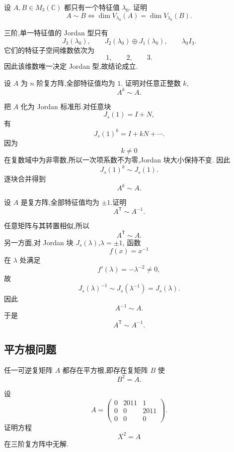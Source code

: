 \begin{example}
设 $A,B\in M_3(\mathbb{C})$ 都只有一个特征值 $\lambda_0$.
证明
\[
A\sim B
\iff
\dim V_{\lambda_0}(A)=\dim V_{\lambda_0}(B).
\]
\end{example}
\exampleblank

\begin{solution}
三阶,单一特征值的 Jordan 型只有
\[
J_3(\lambda_0),\qquad
J_2(\lambda_0)\oplus J_1(\lambda_0),\qquad
\lambda_0I_3.
\]
它们的特征子空间维数依次为
\[
1,\qquad2,\qquad3.
\]
因此该维数唯一决定 Jordan 型,故结论成立.
\end{solution}


\begin{example}[\markstar]
设 $A$ 为 $n$ 阶复方阵,全部特征值均为 $1$.
证明对任意正整数 $k$,
\[
A^k\sim A.
\]
\end{example}
\exampleblank

\begin{solution}
把 $A$ 化为 Jordan 标准形.对任意块
\[
J_s(1)=I+N,
\]
有
\[
J_s(1)^k
=
I+kN+\cdots.
\]
因为
\[
k\neq0
\]
在复数域中为非零数,所以一次项系数不为零,Jordan 块大小保持不变.
因此
\[
J_s(1)^k\sim J_s(1).
\]
逐块合并得到
\[
\boxed{A^k\sim A}.
\]
\end{solution}


\begin{example}[\markstar]
设 $A$ 是复方阵,全部特征值均为 $\pm1$.证明
\[
A^{\mathsf T}\sim A^{-1}.
\]
\end{example}
\exampleblank

\begin{solution}
任意矩阵与其转置相似,所以
\[
A^{\mathsf T}\sim A.
\]
另一方面,对 Jordan 块 $J_s(\lambda)$,$\lambda=\pm1$,
函数
\[
f(x)=x^{-1}
\]
在 $\lambda$ 处满足
\[
f'(\lambda)=-\lambda^{-2}\neq0,
\]
故
\[
J_s(\lambda)^{-1}\sim J_s(\lambda^{-1})=J_s(\lambda).
\]
因此
\[
A^{-1}\sim A.
\]
于是
\[
\boxed{A^{\mathsf T}\sim A^{-1}}.
\]
\end{solution}


\subsection{平方根问题}

\begin{proposition}[\markstar]
任一可逆复矩阵 $A$ 都存在平方根,即存在复矩阵 $B$ 使
\[
B^2=A.
\]
\end{proposition}


\begin{example}
设
\[
A=
\begin{pmatrix}
0&2011&1\\
0&0&2011\\
0&0&0
\end{pmatrix}.
\]
证明方程
\[
X^2=A
\]
在三阶复方阵中无解.
\end{example}
\exampleblank

